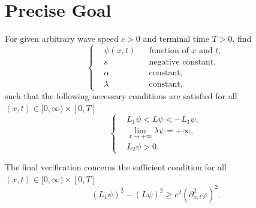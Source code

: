 \documentclass[11pt]{amsart}
\title[\titleShort]{\titleLong}
\author{Author}
\date{}
\numberwithin{algorithm}{section}
\numberwithin{equation}{section}
\begin{document}

\section{Precise Goal}
\begin{tcolorbox}[colback=green!5, colframe=green!75!blue, title=Goal with necessary conditions]
For given arbitrary wave speed $c > 0$ and terminal time $T > 0$, find
\begin{equation*}
    \left\{
    \begin{aligned}
        &\psi(x, t) && \text{function of $x$ and $t$},\\
        &s          && \text{negative constant},\\
        &\alpha     && \text{constant},\\
        &\lambda    && \text{constant},
    \end{aligned}
    \right.
\end{equation*}
such that the following necessary conditions are satisfied for all $(x, t) \in [0, \infty) \times [0, T]$
\begin{equation*}
    \left\{
    \begin{aligned}
        &L_{1} \psi < L \psi < - L_{1} \psi,\\
        &\lim_{x \to + \infty} \lambda \psi = + \infty,\\
        &L_{2} \psi > 0.
    \end{aligned}
    \right.
\end{equation*}
\end{tcolorbox}

\begin{tcolorbox}[colback=orange!5, colframe=orange!80!blue, title=Sufficient condition]
The final verification concerns the sufficient condition for all $(x, t) \in [0, \infty) \times [0, T]$
\begin{equation*}
    (L_{1} \psi)^{2} - (L \psi)^{2}
    \geq
    c^{2} (\partial_{x, t}^{2} \varphi)^{2}.
\end{equation*}
\end{tcolorbox}
\end{document}
